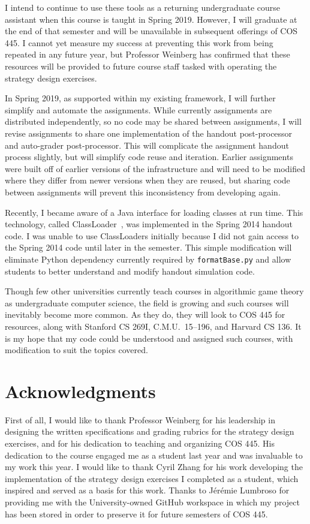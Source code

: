 \documentclass[pageno]{jpaper}
\begin{document}
I intend to continue to use these tools as a returning undergraduate course assistant when this course is taught in Spring 2019.
However, I will graduate at the end of that semester and will be unavailable in subsequent offerings of COS 445.
I cannot yet measure my success at preventing this work from being repeated in any future year, but Professor Weinberg has confirmed that these resources will be provided to future course staff tasked with operating the strategy design exercises.

In Spring 2019, as supported within my existing framework, I will further simplify and automate the assignments.
While currently assignments are distributed independently, so no code may be shared between assignments, I will revise assignments to share one implementation of the handout post-processor and auto-grader post-processor.
This will complicate the assignment handout process slightly, but will simplify code reuse and iteration.
Earlier assignments were built off of earlier versions of the infrastructure and will need to be modified where they differ from newer versions when they are reused, but sharing code between assignments will prevent this inconsistency from developing again.

Recently, I became aware of a Java interface for loading classes at run time.
This technology, called ClassLoader~\cite{classloader}, was implemented in the Spring 2014 handout code.
I was unable to use ClassLoaders initially because I did not gain access to the Spring 2014 code until later in the semester.
This simple modification will eliminate Python dependency currently required by \texttt{formatBase.py} and allow students to better understand and modify handout simulation code.

Though few other universities currently teach courses in algorithmic game theory as undergraduate computer science, the field is growing and such courses will inevitably become more common.
As they do, they will look to COS 445 for resources, along with Stanford CS 269I, C.M.U.\ 15--196, and Harvard CS 136.
It is my hope that my code could be understood and assigned such courses, with modification to suit the topics covered.

\section*{Acknowledgments}
First of all, I would like to thank Professor Weinberg for his leadership in designing the written specifications and grading rubrics for the strategy design exercises, and for his dedication to teaching and organizing COS 445.
His dedication to the course engaged me as a student last year and was invaluable to my work this year.
I would like to thank Cyril Zhang for his work developing the implementation of the strategy design exercises I completed as a student, which inspired and served as a basis for this work.
Thanks to J\'er\'emie Lumbroso for providing me with the University-owned GitHub workspace in which my project has been stored in order to preserve it for future semesters of COS 445.
\end{document}
